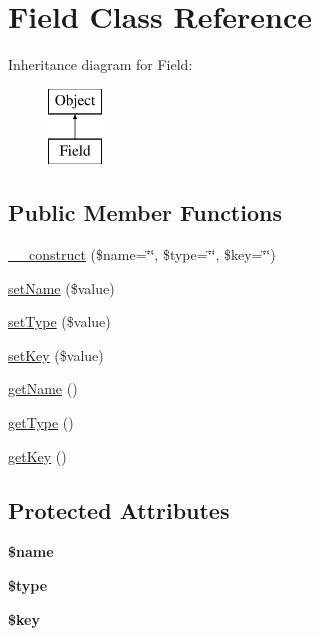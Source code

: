 \hypertarget{classField}{\section{Field Class Reference}
\label{classField}
}
Inheritance diagram for Field\-:\begin{figure}[H]
\begin{center}
\leavevmode
\includegraphics[height=2.000000cm]{classField}
\end{center}
\end{figure}
\subsection*{Public Member Functions}
\begin{DoxyCompactItemize}
\item 
\hyperlink{classField_af06856e25372ab1ea81a80c1594f0d44}{\-\_\-\-\_\-construct} (\$name=\char`\"{}\char`\"{}, \$type=\char`\"{}\char`\"{}, \$key=\char`\"{}\char`\"{})
\item 
\hyperlink{classField_a89957b1c6d642a6dbe15e11d3c5e3be5}{set\-Name} (\$value)
\item 
\hyperlink{classField_a724a16fc34ad198c836d90eb7de35f0d}{set\-Type} (\$value)
\item 
\hyperlink{classField_a99a515259e466f8866828b8f230261c2}{set\-Key} (\$value)
\item 
\hyperlink{classField_ac41d0cb4a99e065d98afa6a5545a5b99}{get\-Name} ()
\item 
\hyperlink{classField_af5d6650254f08096046d8818d009badb}{get\-Type} ()
\item 
\hyperlink{classField_af508c6a175be86258158d522eb0a555b}{get\-Key} ()
\end{DoxyCompactItemize}
\subsection*{Protected Attributes}
\begin{DoxyCompactItemize}
\item 
\hypertarget{classField_a27795da292b8b35025a6fccdd3c117aa}{{\bfseries \$name}}\label{classField_a27795da292b8b35025a6fccdd3c117aa}

\item 
\hypertarget{classField_a86bbb6ecadd6b39f268f68a01e21afed}{{\bfseries \$type}}\label{classField_a86bbb6ecadd6b39f268f68a01e21afed}

\item 
\hypertarget{classField_afaa0d6fab54d59423c9c892eafeae266}{{\bfseries \$key}}\label{classField_afaa0d6fab54d59423c9c892eafeae266}

\end{DoxyCompactItemize}


